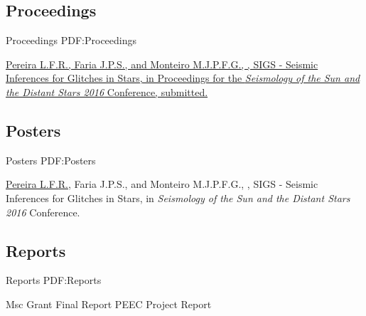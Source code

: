\documentclass[letterpaper,10pt,oneside]{article}
\begin{document}
\begin{body}


\subsection
{Proceedings}
{Proceedings}
{PDF:Proceedings}

\GapNoBreak
{}
\href{}
{\underline{Pereira L.F.R.}, Faria J.P.S., and Monteiro M.J.P.F.G., 
, 
SIGS - Seismic Inferences for Glitches in Stars,
in Proceedings for the \textit{Seismology of the Sun and the Distant Stars 2016} Conference,
submitted.}

\BigGap
\subsection
{Posters}
{Posters}
{PDF:Posters}

{\underline{Pereira L.F.R.}, Faria J.P.S., and Monteiro M.J.P.F.G., 
, 
SIGS - Seismic Inferences for Glitches in Stars,
in \textit{Seismology of the Sun and the Distant Stars 2016} Conference.}

\BigGap
\subsection
{Reports}
{Reports}
{PDF:Reports}

Msc Grant Final Report
PEEC Project Report




\end{body}
\end{document}
